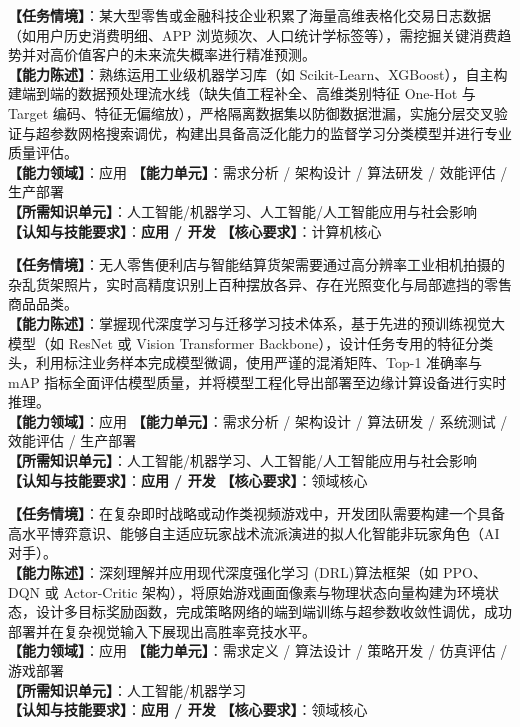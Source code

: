 \begin{taskbox}[任务 5：表格化用户消费行为监督学习预测流水线]
\textbf{【任务情境】}：某大型零售或金融科技企业积累了海量高维表格化交易日志数据（如用户历史消费明细、APP 浏览频次、人口统计学标签等），需挖掘关键消费趋势并对高价值客户的未来流失概率进行精准预测。\\
\textbf{【能力陈述】}：熟练运用工业级机器学习库（如 Scikit-Learn、XGBoost），自主构建端到端的数据预处理流水线（缺失值工程补全、高维类别特征 One-Hot 与 Target 编码、特征无偏缩放），严格隔离数据集以防御数据泄漏，实施分层交叉验证与超参数网格搜索调优，构建出具备高泛化能力的监督学习分类模型并进行专业质量评估。\\
\textbf{【能力领域】}：应用 \quad \textbf{【能力单元】}：需求分析 / 架构设计 / 算法研发 / 效能评估 / 生产部署\\
\textbf{【所需知识单元】}：人工智能/机器学习、人工智能/人工智能应用与社会影响\\
\textbf{【认知与技能要求】}：\textbf{应用 / 开发} \quad \textbf{【核心要求】}：计算机核心
\end{taskbox}

\begin{taskbox}[任务 6：基于深度迁移微调的商品货架图像识别系统]
\textbf{【任务情境】}：无人零售便利店与智能结算货架需要通过高分辨率工业相机拍摄的杂乱货架照片，实时高精度识别上百种摆放各异、存在光照变化与局部遮挡的零售商品品类。\\
\textbf{【能力陈述】}：掌握现代深度学习与迁移学习技术体系，基于先进的预训练视觉大模型（如 ResNet 或 Vision Transformer Backbone），设计任务专用的特征分类头，利用标注业务样本完成模型微调，使用严谨的混淆矩阵、Top-1 准确率与 mAP 指标全面评估模型质量，并将模型工程化导出部署至边缘计算设备进行实时推理。\\
\textbf{【能力领域】}：应用 \quad \textbf{【能力单元】}：需求分析 / 架构设计 / 算法研发 / 系统测试 / 效能评估 / 生产部署\\
\textbf{【所需知识单元】}：人工智能/机器学习、人工智能/人工智能应用与社会影响\\
\textbf{【认知与技能要求】}：\textbf{应用 / 开发} \quad \textbf{【核心要求】}：领域核心
\end{taskbox}

\begin{taskbox}[任务 7：视频游戏中的深度强化学习智能对抗体]
\textbf{【任务情境】}：在复杂即时战略或动作类视频游戏中，开发团队需要构建一个具备高水平博弈意识、能够自主适应玩家战术流派演进的拟人化智能非玩家角色（AI 对手）。\\
\textbf{【能力陈述】}：深刻理解并应用现代深度强化学习 (DRL)算法框架（如 PPO、DQN 或 Actor-Critic 架构），将原始游戏画面像素与物理状态向量构建为环境状态，设计多目标奖励函数，完成策略网络的端到端训练与超参数收敛性调优，成功部署并在复杂视觉输入下展现出高胜率竞技水平。\\
\textbf{【能力领域】}：应用 \quad \textbf{【能力单元】}：需求定义 / 算法设计 / 策略开发 / 仿真评估 / 游戏部署\\
\textbf{【所需知识单元】}：人工智能/机器学习\\
\textbf{【认知与技能要求】}：\textbf{应用 / 开发} \quad \textbf{【核心要求】}：领域核心
\end{taskbox}

